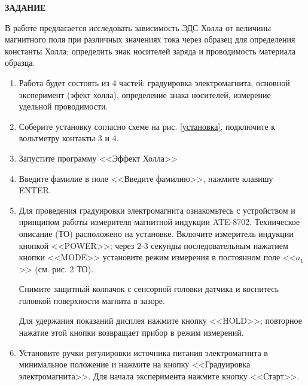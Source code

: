 \documentclass[a4paper,12pt]{article} %
\begin{document}
\begin{center}
\textsf{\textbf{ЗАДАНИЕ}}
\end{center}
В работе предлагается исследовать зависимость ЭДС Холла от величины магнитного поля при различных значениях тока через образец для
определения константы Холла; определить знак носителей заряда и проводимость материала образца.


\begin{enumerate} 
	\item Работа будет состоять из 4 частей: градуировка электромагнита, основной эксперимент (эфект холла), определение знака носителей, измерение удельной проводимости.
  \item Соберите установку согласно схеме на рис. \ref{установка}, подключите к вольтметру контакты 3 и 4.
  \item Запустите программу <<Эффект Холла>>
  \item Введите фамилие в поле <<Введите фамилию>>, нажмите клавишу ENTER.
  
  \item Для проведения градуировки электромагнита ознакомьтесь с устройством и принципом работы измерителя магнитной индукции ATE-8702. Техническое описание (ТО) расположено на установке.
  Включите измеритель индукции кнопкой <<POWER>>; через 2-3 секунды последовательным нажатием кнопки <<MODE>> установите режим измерения в постоянном поле  <<$a_1$>> (см. рис. 2 ТО).
  
  Снимите защитный колпачок с сенсорной головки датчика и коснитесь головкой поверхности магнита в зазоре.
  
  Для удержания показаний дисплея нажмите кнопку <<HOLD>>; повторное нажатие этой кнопки возвращает прибор в режим измерений.
  
  \item Установите ручки регулировки источника питания электромагнита в минимальное положение и нажмите на кнопку <<Градуировка электромагнита>>. Для начала эксперимента нажмите кнопку  <<Старт>>.
  

\end{enumerate}
\end{document}
